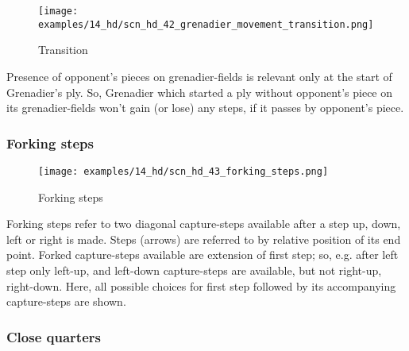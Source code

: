 \vspace*{-0.7\baselineskip}
\noindent
\begin{wrapfigure}[6]{l}{0.4\textwidth}
\centering
\texttt{[image: examples/14\_hd/scn\_hd\_42\_grenadier\_movement\_transition.png]}
\vspace*{-0.5\baselineskip}
\caption{Transition}
\label{fig:scn_hd_42_grenadier_movement_transition}
\end{wrapfigure}
Presence of opponent's pieces on grenadier-fields is relevant only at the start of
Grenadier's ply. \newline
\indent
So, Grenadier which started a ply without opponent's piece on its grenadier-fields
won't gain (or lose) any steps, if it passes by opponent's piece.

\vspace*{-1.3\baselineskip}
\subsubsection*{Forking steps}
\label{sec:Hemera's Dawn/Grenadier/Movement/Forking steps}

\vspace*{-0.7\baselineskip}
\noindent
\begin{wrapfigure}[11]{l}{0.4\textwidth}
\centering
\texttt{[image: examples/14\_hd/scn\_hd\_43\_forking\_steps.png]}
\vspace*{-0.5\baselineskip}
\caption{Forking steps}
\label{fig:scn_hd_43_forking_steps}
\end{wrapfigure}
Forking steps refer to two diagonal capture-steps available after a step up, down,
left or right is made. \newline
\indent
Steps (arrows) are referred to by relative position of its end point. \newline
\indent
Forked capture-steps available are extension of first step; so, e.g. after left
step only left-up, and left-down capture-steps are available, but not right-up,
right-down. \newline
\indent
Here, all possible choices for first step followed by its accompanying
capture-steps are shown.

\clearpage %

\subsubsection*{Close quarters}
\label{sec:Hemera's Dawn/Grenadier/Movement/Close quarters}

